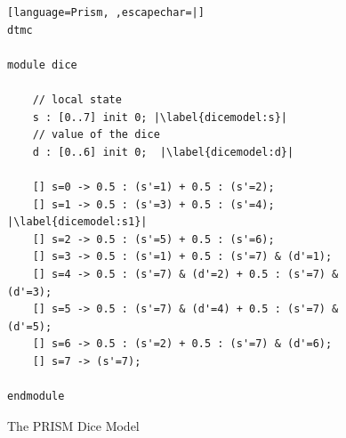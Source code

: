 \documentclass[
a4paper,
12pt
]{scrartcl}
\begin{document}
\begin{figure}[ht!]
\begin{lstlisting}[language=Prism, ,escapechar=|]
dtmc

module dice

	// local state
	s : [0..7] init 0; |\label{dicemodel:s}|
	// value of the dice
	d : [0..6] init 0;  |\label{dicemodel:d}|
	
	[] s=0 -> 0.5 : (s'=1) + 0.5 : (s'=2);
	[] s=1 -> 0.5 : (s'=3) + 0.5 : (s'=4); |\label{dicemodel:s1}|
	[] s=2 -> 0.5 : (s'=5) + 0.5 : (s'=6);
	[] s=3 -> 0.5 : (s'=1) + 0.5 : (s'=7) & (d'=1);
	[] s=4 -> 0.5 : (s'=7) & (d'=2) + 0.5 : (s'=7) & (d'=3);
	[] s=5 -> 0.5 : (s'=7) & (d'=4) + 0.5 : (s'=7) & (d'=5);
	[] s=6 -> 0.5 : (s'=2) + 0.5 : (s'=7) & (d'=6);
	[] s=7 -> (s'=7);
	
endmodule

\end{lstlisting}
\caption{The PRISM Dice Model}
\label{fig:dicemodel}
\end{figure}
\end{document}
